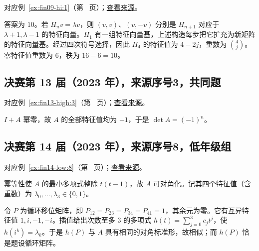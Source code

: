 \documentclass[UTF8,12pt,a4paper,fontset=fandol]{ctexart}
\begin{document}
对应例~\ref{ex:fin09-hi:1}（第~\pageref{ex:fin09-hi:1} 页）；\href{https://github.com/lzxcr/cmc-mathematics/blob/64916fa1fdbc3e444a652eca204d5669058ee321/src/problems/finals/09/01.md}{查看来源}。

\begin{solve}

答案为 $10$。若 $H_nv=\lambda v$，则 $(v,v)$、$(v,-v)$ 分别是 $H_{n+1}$ 对应于 $\lambda+1,\lambda-1$ 的特征向量。$H_1$ 有一组特征向量基，上述构造每步把它扩充为新矩阵的特征向量基。经过四次符号选择，因此 $H_4$ 的特征值为 $4-2j$，重数为 $\binom4j$。零特征值重数为 $6$，秩为 $16-6=10$。

\end{solve}

\subsection{决赛第 13 届（2023 年），来源序号3，共同题}\label{ans:fin13-high:3}\label{pr:fin13-high:3}

对应例~\ref{ex:fin13-high:3}（第~\pageref{ex:fin13-high:3} 页）；\href{https://github.com/lzxcr/cmc-mathematics/blob/64916fa1fdbc3e444a652eca204d5669058ee321/src/problems/finals/13/03.md}{查看来源}。

\begin{solve}

$I+A$ 幂零，故 $A$ 的全部特征值均为 $-1$，于是 $\boxed{\det A=(-1)^n}$。

\end{solve}

\subsection{决赛第 14 届（2023 年），来源序号8，低年级组}\label{ans:fin14-low:8}\label{pr:fin14-low:8}

对应例~\ref{ex:fin14-low:8}（第~\pageref{ex:fin14-low:8} 页）；\href{https://github.com/lzxcr/cmc-mathematics/blob/64916fa1fdbc3e444a652eca204d5669058ee321/src/problems/finals/14/08.md}{查看来源}。

\begin{solve}

幂等性使 $A$ 的最小多项式整除 $t(t-1)$，故 $A$ 可对角化。记其四个特征值（含重数）为 $\lambda_0,\dots,\lambda_3\in\{0,1\}$。

令 $P$ 为循环移位矩阵，即 $P_{12}=P_{23}=P_{34}=P_{41}=1$，其余元为零。它有互异特征值 $1,i,-1,-i$。插值给出次数至多 $3$ 的多项式 $h(t)=\sum_{j=0}^3c_jt^j$，使 $h(i^k)=\lambda_k$。于是 $h(P)$ 与 $A$ 具有相同的对角标准形，故相似；而 $h(P)$ 恰是题设循环矩阵。

\end{solve}
\end{document}
